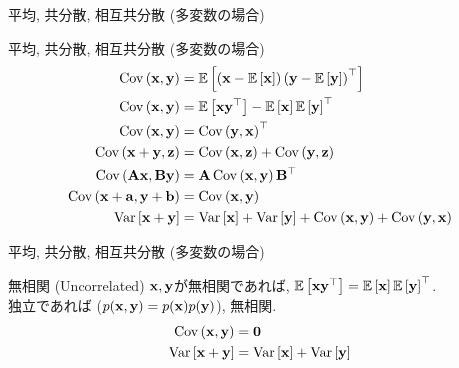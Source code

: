 \documentclass[dvipdfmx,notheorems,t]{beamer}
\begin{document}
\begin{frame}{平均, 共分散, 相互共分散 (多変数の場合)}
\begin{block}{平均, 共分散, 相互共分散 (多変数の場合)}
  \begin{align*}
    \Cov{\vb{x}}{\vb{y}} &= \E{\left( \vb{x} - \E{\vb{x}} \right) \left( \vb{y} - \E{\vb{y}} \right)^\top} \\
    \Cov{\vb{x}}{\vb{y}} &= \E{\vb{x} \vb{y}^\top} - \E{\vb{x}} \E{\vb{y}}^\top \\
    \Cov{\vb{x}}{\vb{y}} &= \Cov{\vb{y}}{\vb{x}}^\top \\
    \Cov{\vb{x} + \vb{y}}{\vb{z}} &= \Cov{\vb{x}}{\vb{z}} + \Cov{\vb{y}}{\vb{z}} \\
    \Cov{\vb{A} \vb{x}}{\vb{B} \vb{y}} &= \vb{A} \Cov{\vb{x}}{\vb{y}} \vb{B}^\top \\
    \Cov{\vb{x} + \vb{a}}{\vb{y} + \vb{b}} &= \Cov{\vb{x}}{\vb{y}} \\
    \Var{\vb{x} + \vb{y}} &= \Var{\vb{x}} + \Var{\vb{y}}
      + \Cov{\vb{x}}{\vb{y}} + \Cov{\vb{y}}{\vb{x}}
  \end{align*}
\end{block}
\end{frame}

\begin{frame}{平均, 共分散, 相互共分散 (多変数の場合)}
\begin{block}{無相関 (Uncorrelated)}
  $\vb{x}, \vb{y}$が無相関であれば, $\E{\vb{x} \vb{y}^\top} = \E{\vb{x}} \E{\vb{y}}^\top$. \\
  独立であれば ($p(\vb{x}, \vb{y}) = p(\vb{x}) p(\vb{y})$), 無相関.
  \begin{align*}
    \Cov{\vb{x}}{\vb{y}} &= \vb{0} \\
    \Var{\vb{x} + \vb{y}} &= \Var{\vb{x}} + \Var{\vb{y}}
  \end{align*}
\end{block}
\end{frame}
\end{document}
